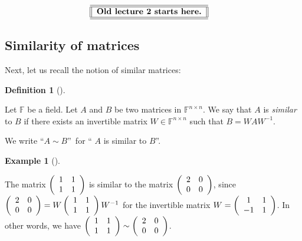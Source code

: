 \documentclass[numbers=enddot,12pt,final,onecolumn,notitlepage]{scrartcl}%
\numberwithin{exer}{subsection}
\theoremstyle{definition}
\newtheorem{defi}[theo]{Definition}
\newenvironment{definition}[1][]
{\begin{defi}[#1]\begin{leftbar}}
{\end{leftbar}\end{defi}}
\newtheorem{exam}[theo]{Example}
\newenvironment{example}[1][]
{\begin{exam}[#1]\begin{leftbar}}
{\end{leftbar}\end{exam}}
\newenvironment{noncompile}{}{}
\begin{document}
\begin{noncompile}%
\[%
\begin{tabular}
[c]{||l||}\hline\hline
\textbf{Old lecture 2 starts here.}\\\hline\hline
\end{tabular}
\ \ \
\]

\end{noncompile}

\subsection{\label{sec.schur.similar}Similarity of matrices}

Next, let us recall the notion of similar matrices:

\begin{definition}
\label{def.schurtri.similar.def}Let $\mathbb{F}$ be a field. Let $A$ and $B$
be two matrices in $\mathbb{F}^{n\times n}$. We say that $A$ is \emph{similar}
to $B$ if there exists an invertible matrix $W\in\mathbb{F}^{n\times n}$ such
that $B=WAW^{-1}$.

We write \textquotedblleft$A\sim B$\textquotedblright\ for \textquotedblleft%
$A$ is similar to $B$\textquotedblright.
\end{definition}

\begin{example}
The matrix $\left(
\begin{array}
[c]{cc}%
1 & 1\\
1 & 1
\end{array}
\right)  $ is similar to the matrix $\left(
\begin{array}
[c]{cc}%
2 & 0\\
0 & 0
\end{array}
\right)  $, since $\left(
\begin{array}
[c]{cc}%
2 & 0\\
0 & 0
\end{array}
\right)  =W\left(
\begin{array}
[c]{cc}%
1 & 1\\
1 & 1
\end{array}
\right)  W^{-1}$ for the invertible matrix $W=\left(
\begin{array}
[c]{cc}%
1 & 1\\
-1 & 1
\end{array}
\right)  $. In other words, we have $\left(
\begin{array}
[c]{cc}%
1 & 1\\
1 & 1
\end{array}
\right)  \sim\left(
\begin{array}
[c]{cc}%
2 & 0\\
0 & 0
\end{array}
\right)  $.
\end{example}
\end{document}
